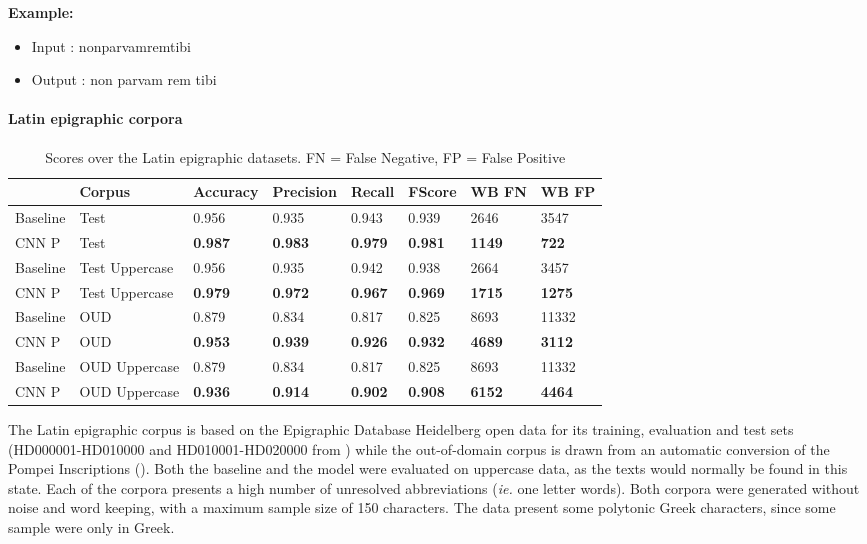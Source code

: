 \documentclass{jdmdh}
\begin{document}
\textbf{Example:}

\begin{itemize}
    \item Input : nonparvamremtibi	
    \item Output : non parvam rem tibi

\end{itemize}

\paragraph{Latin epigraphic corpora}

\begin{table}[H]
\centering
\begin{tabular}{llllllll}
\hline
 & Corpus & Accuracy & Precision & Recall & FScore & WB FN & WB FP \\ \hline
Baseline & Test & 0.956 & 0.935 & 0.943 & 0.939 & 2646 & 3547 \\
CNN P & Test & \textbf{0.987} & \textbf{0.983} & \textbf{0.979} & \textbf{0.981} & \textbf{1149} & \textbf{722} \\ \hline
Baseline & Test Uppercase & 0.956 & 0.935 & 0.942 & 0.938 & 2664 & 3457 \\
CNN P & Test Uppercase & \textbf{0.979} & \textbf{0.972} & \textbf{0.967} & \textbf{0.969} & \textbf{1715} & \textbf{1275} \\ \hline
Baseline & OUD & 0.879 & 0.834 & 0.817 & 0.825 & 8693 & 11332 \\
CNN P & OUD & \textbf{0.953} & \textbf{0.939} & \textbf{0.926} & \textbf{0.932} & \textbf{4689} & \textbf{3112} \\ \hline
Baseline & OUD Uppercase & 0.879 & 0.834 & 0.817 & 0.825 & 8693 & 11332 \\
CNN P & OUD Uppercase & \textbf{0.936} & \textbf{0.914} & \textbf{0.902} & \textbf{0.908} & \textbf{6152} & \textbf{4464} \\ \hline
\end{tabular}
\caption{Scores over the Latin epigraphic datasets. FN = False Negative, FP = False Positive}
\label{tab:epigraphyc_latin}
\end{table}


The Latin epigraphic corpus is based on the Epigraphic Database Heidelberg open data for its training, evaluation and test sets (HD000001-HD010000 and HD010001-HD020000 from \citet{edh}) while the out-of-domain corpus is drawn from an automatic conversion of the Pompei Inscriptions (\citet{pompei}). Both the baseline and the model were evaluated on uppercase data, as the texts would normally be found in this state. Each of the corpora presents a high number of unresolved abbreviations (\textit{ie.} one letter words). Both corpora were generated without noise and word keeping, with a maximum sample size of 150 characters. The data present some polytonic Greek characters, since some sample were only in Greek.
\end{document}
